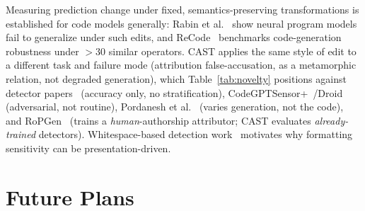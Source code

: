 \documentclass[10pt,conference]{IEEEtran}
\begin{document}
Measuring prediction change under fixed, semantics-preserving transformations is established for code models generally: Rabin et al.~\cite{rabin} show neural program models fail to generalize under such edits, and ReCode~\cite{recode} benchmarks code-generation robustness under $>$30 similar operators. CAST applies the same style of edit to a different task and failure mode (attribution false-accusation, as a metamorphic relation, not degraded generation), which Table~\ref{tab:novelty} positions against detector papers~\cite{gptsniffer,llmsniffer,detectcodegpt,codegptsensor} (accuracy only, no stratification), CodeGPTSensor+~\cite{codegptsensorplus}/Droid~\cite{droid} (adversarial, not routine), Pordanesh et al.~\cite{hidinginplainsight} (varies generation, not the code), and RoPGen~\cite{ropgen} (trains a \emph{human}-authorship attributor; CAST evaluates \emph{already-trained} detectors). Whitespace-based detection work~\cite{whitespaces} motivates why formatting sensitivity can be presentation-driven.

\begin{table}[t]
\centering
\caption{Novelty positioning against the closest prior work.}
\label{tab:novelty}
\end{table}

\section{Future Plans}
\end{document}
